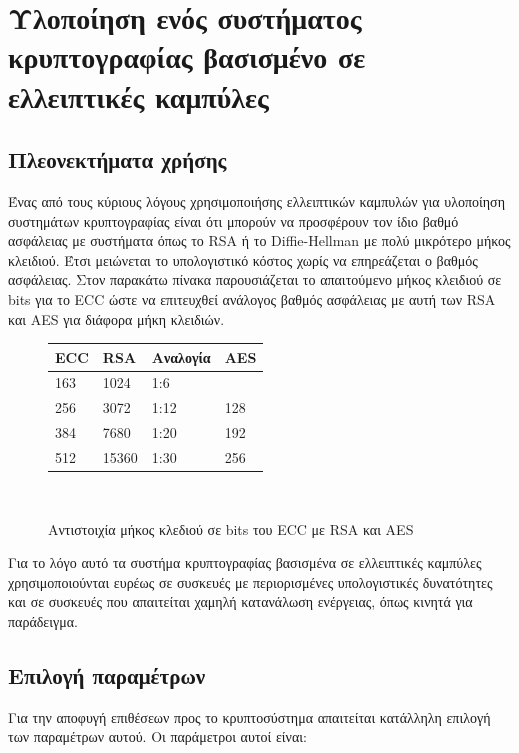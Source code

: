 \documentclass[12pt]{article}
\begin{document}
\section{Υλοποίηση ενός συστήματος κρυπτογραφίας βασισμένο σε ελλειπτικές καμπύλες}
\subsection{Πλεονεκτήματα χρήσης}
Ένας από τους κύριους λόγους χρησιμοποιήσης ελλειπτικών καμπυλών για υλοποίηση συστημάτων κρυπτογραφίας είναι ότι μπορούν να προσφέρουν τον ίδιο βαθμό ασφάλειας με συστήματα όπως το RSA ή το Diffie-Hellman με πολύ μικρότερο μήκος κλειδιού. Έτσι μειώνεται το υπολογιστικό κόστος χωρίς να επηρεάζεται ο βαθμός ασφάλειας. Στον παρακάτω πίνακα παρουσιάζεται το απαιτούμενο μήκος κλειδιού σε bits για το ECC ώστε να επιτευχθεί ανάλογος βαθμός ασφάλειας με αυτή των RSA και AES για διάφορα μήκη κλειδιών.
\\ \medskip


\begin{figure}[!htbp]
\begin{center}
\begin{tabular}{|l|l|l|l|} \hline
\textbf{ECC} & \textbf{RSA} & \textbf{Αναλογία} & \textbf{AES} \\ \hline
163 & 1024 & 1:6 & \\ \hline
256 & 3072 & 1:12 & 128 \\ \hline
384 & 7680 & 1:20 & 192 \\ \hline
512 & 15360 & 1:30 & 256 \\ \hline
\end{tabular} \\
\end{center}
\caption{Αντιστοιχία μήκος κλεδιού σε bits του ECC με RSA και AES}
\end{figure}


Για το λόγο αυτό τα συστήμα κρυπτογραφίας βασισμένα σε ελλειπτικές καμπύλες χρησιμοποιούνται ευρέως σε συσκευές με περιορισμένες υπολογιστικές δυνατότητες και σε συσκευές που απαιτείται χαμηλή κατανάλωση ενέργειας, όπως κινητά για παράδειγμα.

\subsection{Επιλογή παραμέτρων}
Για την αποφυγή επιθέσεων προς το κρυπτοσύστημα απαιτείται κατάλληλη επιλογή των παραμέτρων αυτού.
Οι παράμετροι αυτοί είναι:
\end{document}
